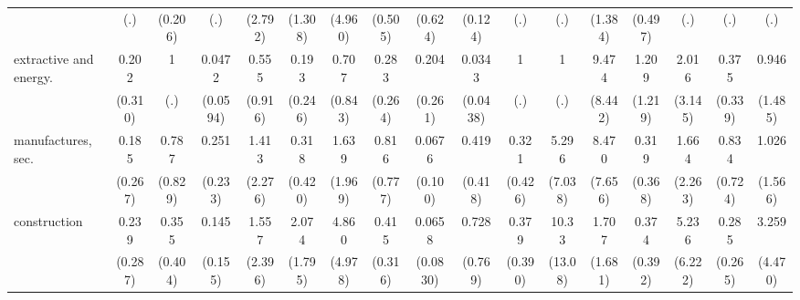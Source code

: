 {\begin{tabular}{l*{16}{c}}
                    &         (.)         &     (0.206)         &         (.)         &     (2.792)         &     (1.308)         &     (4.960)         &     (0.505)         &     (0.624)         &     (0.124)         &         (.)         &         (.)         &     (1.384)         &     (0.497)         &         (.)         &         (.)         &         (.)         \\
[1em]
extractive and energy.&       0.202         &           1         &      0.0472\sym{*}  &       0.555         &       0.193         &       0.707         &       0.283         &       0.204         &      0.0343\sym{**} &           1         &           1         &       9.474\sym{*}  &       1.209         &       2.016         &       0.375         &       0.946         \\
                    &     (0.310)         &         (.)         &    (0.0594)         &     (0.916)         &     (0.246)         &     (0.843)         &     (0.264)         &     (0.261)         &    (0.0438)         &         (.)         &         (.)         &     (8.442)         &     (1.219)         &     (3.145)         &     (0.339)         &     (1.485)         \\
[1em]
manufactures, sec.  &       0.185         &       0.787         &       0.251         &       1.413         &       0.318         &       1.639         &       0.816         &      0.0676         &       0.419         &       0.321         &       5.296         &       8.470\sym{*}  &       0.319         &       1.664         &       0.834         &       1.026         \\
                    &     (0.267)         &     (0.829)         &     (0.233)         &     (2.276)         &     (0.420)         &     (1.969)         &     (0.777)         &     (0.100)         &     (0.418)         &     (0.426)         &     (7.038)         &     (7.656)         &     (0.368)         &     (2.263)         &     (0.724)         &     (1.566)         \\
[1em]
construction        &       0.239         &       0.355         &       0.145         &       1.557         &       2.074         &       4.860         &       0.415         &      0.0658\sym{*}  &       0.728         &       0.379         &       10.33         &       1.707         &       0.374         &       5.236         &       0.285         &       3.259         \\
                    &     (0.287)         &     (0.404)         &     (0.155)         &     (2.396)         &     (1.795)         &     (4.978)         &     (0.316)         &    (0.0830)         &     (0.769)         &     (0.390)         &     (13.08)         &     (1.681)         &     (0.392)         &     (6.222)         &     (0.265)         &     (4.470)         \\

\end{tabular}}
